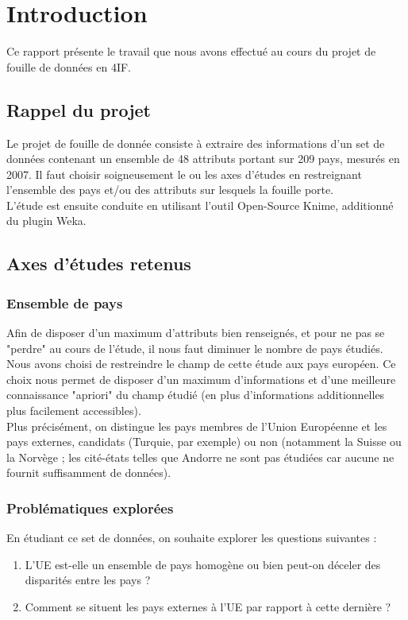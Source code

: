 \section{Introduction}

Ce rapport présente le travail que nous avons effectué au cours du projet
de fouille de données en 4IF.


\subsection{Rappel du projet}

Le projet de fouille de donnée consiste à extraire des informations d'un
set de données contenant un ensemble de 48 attributs portant sur 209 pays,
mesurés en 2007. Il faut choisir soigneusement le ou les axes d'études en
restreignant l'ensemble des pays et/ou des attributs sur lesquels la
fouille porte.\\
L'étude est ensuite conduite en utilisant l'outil Open-Source Knime,
additionné du plugin Weka.


\subsection{Axes d'études retenus}

\subsubsection{Ensemble de pays}
Afin de disposer d'un maximum d'attributs bien renseignés, et pour ne pas
se "perdre" au cours de l'étude, il nous faut diminuer le nombre de pays
étudiés.\\
Nous avons choisi de restreindre le champ de cette étude aux pays européen.
Ce choix nous permet de disposer d'un maximum d'informations et d'une
meilleure connaissance "apriori" du champ étudié (en plus d'informations
additionnelles plus facilement accessibles).\\
Plus précisément, on distingue les pays membres de l'Union Européenne et
les pays externes, candidats (Turquie, par exemple) ou non (notamment la
Suisse ou la Norvège ; les cité-états telles que Andorre ne sont pas
étudiées car aucune ne fournit suffisamment de données).\\

\subsubsection{Problématiques explorées}
En étudiant ce set de données, on souhaite explorer les questions suivantes
:
\begin{enumerate}
\item L'UE est-elle un ensemble de pays homogène ou bien peut-on déceler
des disparités entre les pays ?
\item Comment se situent les pays externes à l'UE par rapport à cette
dernière ?
\end{enumerate}


